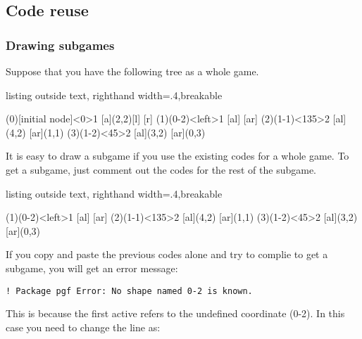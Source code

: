 \subsection{Code reuse}

\subsubsection{Drawing subgames}

Suppose that you have the following tree as a whole game.

\begin{tcblisting}{listing outside text, righthand width=.4\linewidth,breakable}
\begin{istgame}
\xtdistance{15mm}{30mm}
\istroot[-135](0)[initial node]<0>{1}
  [a]{(2,2)}[l]
  [r]
  \endist 
\istroot(1)(0-2)<left>{1}
  [al]
  [ar]
  \endist 
\xtdistance{10mm}{20mm}
\istroot(2)(1-1)<135>{2}
  \istb{\ell}[al]{(4,2)}
  [ar]{(1,1)}
  \endist 
\istroot(3)(1-2)<45>{2}
  \istb{\ell}[al]{(3,2)}
  [ar]{(0,3)}
  \endist 
\end{istgame}
\end{tcblisting}

It is easy to draw a subgame if you use the existing codes for a whole game.
To get a subgame, just comment out the codes for the rest of the subgame.

\begin{tcblisting}{listing outside text, righthand width=.4\linewidth,breakable}
\begin{istgame}
\xtdistance{15mm}{30mm}
\istroot(1)(0-2)<left>{1}
  [al]
  [ar]
  \endist 
\xtdistance{10mm}{20mm}
\istroot(2)(1-1)<135>{2}
  \istb{\ell}[al]{(4,2)}
  [ar]{(1,1)}
  \endist 
\istroot(3)(1-2)<45>{2}
  \istb{\ell}[al]{(3,2)}
  [ar]{(0,3)}
  \endist 
\end{istgame}
\end{tcblisting}

\remark If you copy and paste the previous codes alone and try to complie to get a subgame, you will get an error message: 

\verb+! Package pgf Error: No shape named 0-2 is known.+

\noindent 
This is because the first active \cmd{\istroot} refers to the undefined coordinate \xw(0-2). In this case you need to change the line as:


